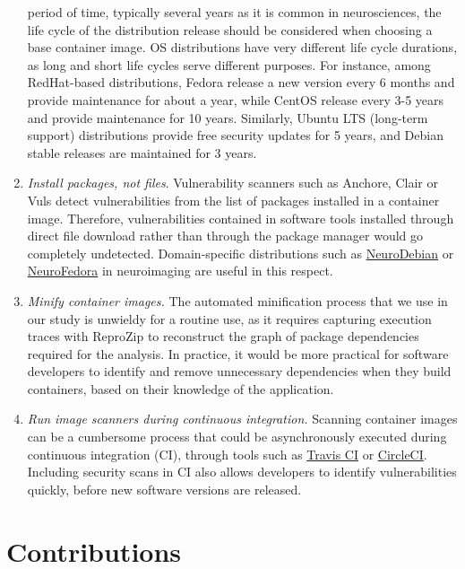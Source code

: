 \begin{enumerate}
period of time, typically several years as it is common in neurosciences,
the life cycle of the distribution release should be considered when
choosing a base container image. OS distributions have very different life
cycle durations, as long and short life cycles serve different purposes.
For instance, among RedHat-based distributions, Fedora release a new version
every 6 months and provide maintenance for about a year, while CentOS
release every 3-5 years and provide maintenance for 10 years. Similarly,
Ubuntu LTS (long-term support) distributions provide free security updates
for 5 years, and Debian stable releases are maintained for 3 years.
\item \emph{Install packages, not files}. Vulnerability scanners such as
Anchore, Clair or Vuls detect vulnerabilities from the list of packages
installed in a container image. Therefore, vulnerabilities contained in
software tools installed through direct file download rather than through
the package manager would go completely undetected. Domain-specific
distributions such as \href{http://neuro.debian.net}{NeuroDebian} or
\href{https://docs.fedoraproject.org/en-US/neurofedora/overview/}{NeuroFedora}
in neuroimaging are useful in this respect.
\item \emph{Minify container images.} The automated minification
process that we use in our study is unwieldy for a routine use, as it
requires capturing execution traces with ReproZip to reconstruct the graph
of package dependencies required for the analysis. In practice, it would be
more practical for software developers to identify and remove unnecessary
dependencies when they build containers, based on their knowledge of the
application.
\item \emph{Run image scanners during continuous integration.} Scanning
container images can be a cumbersome process that
could be asynchronously executed during continuous integration (CI),
through tools such as \href{https://travis-ci.org/}{Travis CI} or \href{https://circleci.com/}{CircleCI}. Including security scans in
CI also allows developers to identify vulnerabilities quickly,
before new software versions are released.
\end{enumerate}

\section{Contributions}

